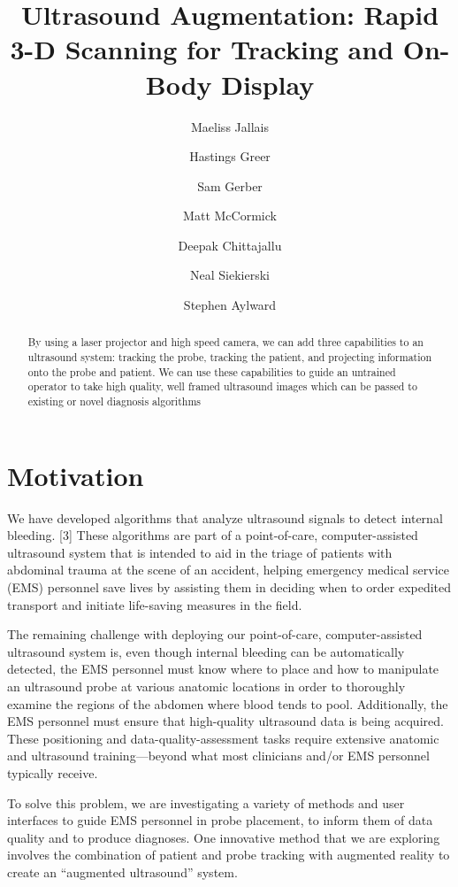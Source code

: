 \documentclass{llncs}
\begin{document}
%
\frontmatter
%
\pagestyle{headings}
\title{Ultrasound Augmentation: Rapid 3-D Scanning for Tracking and On-Body Display}
\author{Maeliss Jallais \and Hastings Greer \and Sam Gerber \and Matt McCormick \and Deepak Chittajallu \and Neal Siekierski \and Stephen Aylward}
%
\mainmatter
\maketitle

\begin{abstract}
By using a laser projector and high speed camera, we can add three capabilities to an ultrasound system: tracking the probe, tracking the patient, and projecting information onto the probe and patient. We can use these capabilities to guide an untrained operator to take high quality, well framed ultrasound images which can be passed to existing or novel diagnosis algorithms
\end{abstract}


\section{Motivation}
We have developed algorithms that analyze ultrasound signals to detect internal bleeding. [3] These algorithms are part of a point-of-care, computer-assisted ultrasound system that is intended to aid in the triage of patients with abdominal trauma at the scene of an accident, helping emergency medical service (EMS) personnel save lives by assisting them in deciding when to order expedited transport and initiate life-saving measures in the field.

The remaining challenge with deploying our point-of-care, computer-assisted ultrasound system is, even though internal bleeding can be automatically detected, the EMS personnel must know where to place and how to manipulate an ultrasound probe at various anatomic locations in order to thoroughly examine the regions of the abdomen where blood tends to pool. Additionally, the EMS personnel must ensure that high-quality ultrasound data is being acquired. These positioning and data-quality-assessment tasks require extensive anatomic and ultrasound training—beyond what most clinicians and/or EMS personnel typically receive.

To solve this problem, we are investigating a variety of methods and user interfaces to guide EMS personnel in probe placement, to inform them of data quality and to produce diagnoses. One innovative method that we are exploring involves the combination of  patient and probe tracking with augmented reality to create an “augmented ultrasound” system.
\end{document}
